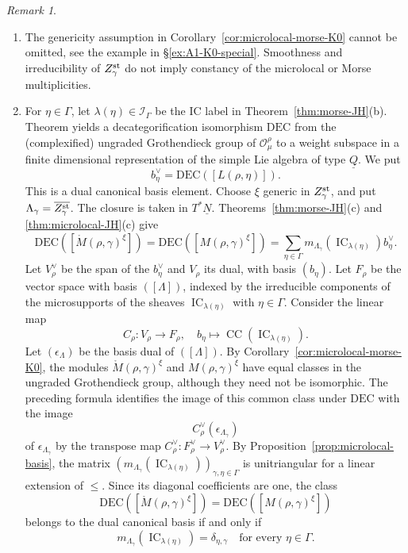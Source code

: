 \documentclass[11pt,reqno]{amsart}
\theoremstyle{definition}
\theoremstyle{remark}
\newtheorem{Remark}[Theorem]{Remark}
\def\dN{\underline N}
\def\dQ{\underline Q}
\def\scrO{\mathscr O}
\def\DEC{\mathrm{DEC}}
\def\IC{\operatorname{IC}}
\begin{document}
\begin{Remark}\label{rem:genericity-necessary}\hfill
\begin{enumerate}[label=$\mathrm{(\alph*)}$,leftmargin=8mm]
\item
The genericity assumption in Corollary~\ref{cor:microlocal-morse-K0}
cannot be omitted, see the example in \S\ref{ex:A1-K0-special}.
Smoothness and irreducibility of $Z_\gamma^{\rm st}$ do not imply
constancy of the microlocal or Morse multiplicities.





\item
For $\eta\in\Gamma$, let $\lambda(\eta)\in\mathcal I_\Gamma$
be the IC label  in Theorem~\ref{thm:morse-JH}(b). 
Theorem \cite[Thm.~4.4.2]{VV25} yields a
decategorification isomorphism $\DEC$ from the (complexified) ungraded Grothendieck group
of $\scrO_\mu^\rho$ to a weight subspace in a finite dimensional representation
of the simple Lie algebra of type $\dQ$.
We put 
$$b_\eta^\vee=\DEC([L(\rho,\eta)]).$$
This is a dual canonical basis element.
Choose $\xi$ generic in $Z_\gamma^{\rm st}$, and put
$\Lambda_\gamma=\overline{Z_\gamma^{\rm st}}$.
The closure is taken in $T^*\dN$.
Theorems~\ref{thm:morse-JH}(c) and \ref{thm:microlocal-JH}(c) give
\[
 \DEC([\mathring M(\rho,\gamma)^\xi])
 =\DEC([M(\rho,\gamma)^\xi])
 =\sum_{\eta\in\Gamma}m_{\Lambda_\gamma}(\IC_{\lambda(\eta)})b_\eta^\vee.
\]
Let $V_\rho^\vee$ be the span of the $b_\eta^\vee$ and
$V_\rho$ its dual, with basis $(b_\eta)$. Let $F_\rho$ be the vector
space with basis $([\Lambda])$, indexed by the irreducible components
of the microsupports of the sheaves $\IC_{\lambda(\eta)}$ with $\eta\in\Gamma$.
Consider the linear map
\[
 C_\rho:V_\rho\longrightarrow F_\rho,\quad
 b_\eta\longmapsto\operatorname{CC}(\IC_{\lambda(\eta)}).
\]
Let $(\epsilon_\Lambda)$ be the basis dual of $([\Lambda])$.
By Corollary~\ref{cor:microlocal-morse-K0}, the modules
$\mathring M(\rho,\gamma)^\xi$ and 
$M(\rho,\gamma)^\xi$ have equal classes in the ungraded Grothendieck
group, although they need not be isomorphic. The preceding formula
identifies the image of this common class under $\DEC$
with the image 
$$C_\rho^\vee(\epsilon_{\Lambda_\gamma})$$ 
of $\epsilon_{\Lambda_\gamma}$ by the transpose map
$C_\rho^\vee:F_\rho^\vee\to V_\rho^\vee.$
By Proposition~\ref{prop:microlocal-basis}, the matrix
$(m_{\Lambda_\gamma}(\IC_{\lambda(\eta)}))_{\gamma,\eta\in\Gamma}$
is unitriangular for a linear extension of $\leqslant$.
Since its diagonal coefficients are one, the class
$$\DEC([\mathring M(\rho,\gamma)^\xi])=\DEC([M(\rho,\gamma)^\xi])$$ belongs to the
dual canonical basis if and only if
\[
 m_{\Lambda_\gamma}(\IC_{\lambda(\eta)})=\delta_{\eta,\gamma}
 \quad\text{for every }\eta\in\Gamma.
\]

\end{enumerate}
\end{Remark}
\end{document}
